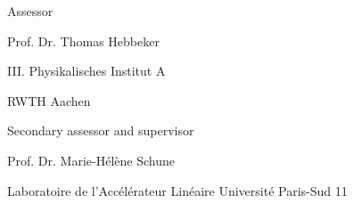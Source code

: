 \documentclass{wissdoc}
\newcommand{\blankpage}{%
\clearpage{\pagestyle{empty}\cleardoublepage}
}
\begin{document}
\lstset{language=C++, basicstyle =\ttfamily}

\blankpage %

\begin{minipage}[c]{0.49\textwidth}
\vskip 20cm
Assessor 

\vspace{0.7cm}
Prof. Dr. Thomas Hebbeker

III. Physikalisches Institut A

RWTH Aachen
\end{minipage}
\begin{minipage}[c]{0.49\textwidth}
\vskip 20cm
Secondary assessor and supervisor

\vspace{0.7cm}
Prof. Dr. Marie-H\'{e}l\`{e}ne Schune

Laboratoire de l'Acc\'{e}l\'{e}rateur Lin\'{e}aire
Universit\'{e} Paris-Sud 11
\end{minipage} 




\ifnotdraft{
\tableofcontents
\blankpage
}
\graphicspath{{bilder/}} 







%
%
%
%
%
%
%
\cleardoublepage

\renewcommand{\appendixname}{Appendix}
\begin{appendix}
 
\end{appendix}
%
\cleardoublepage

\end{document}
